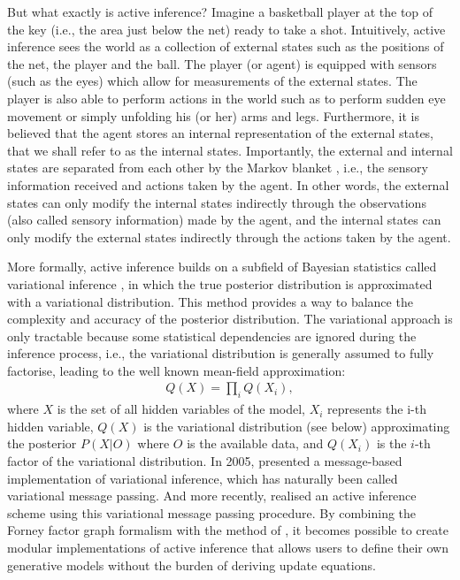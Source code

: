 \documentclass[twoside,11pt]{article}
\begin{document}
But what exactly is active inference? Imagine a basketball player at the top of the key (i.e., the area just below the net) ready to take a shot. Intuitively, active inference sees the world as a collection of external states such as the positions of the net, the player and the ball. The player (or agent) is equipped with sensors (such as the eyes) which allow for measurements of the external states. The player is also able to perform actions in the world such as to perform sudden eye movement or simply unfolding his (or her) arms and legs. Furthermore, it is believed that the agent stores an internal representation of the external states, that we shall refer to as the internal states. Importantly, the external and internal states are separated from each other by the Markov blanket \citep{MarkovBlanket}, i.e., the sensory information received and actions taken by the agent. In other words, the external states can only modify the internal states indirectly through the observations (also called sensory information) made by the agent, and the internal states can only modify the external states indirectly through the actions taken by the agent. 

More formally, active inference builds on a subfield of Bayesian statistics called variational inference \citep{VI_TUTO}, in which the true posterior distribution is approximated with a variational distribution. This method provides a way to balance the complexity and accuracy of the posterior distribution. The variational approach is only tractable because some statistical dependencies are ignored during the inference process, i.e., the variational distribution is generally assumed to fully factorise, leading to the well known mean-field approximation:
\begin{align}
Q(X) = \prod_{i} Q(X_i),
\end{align}
where $X$ is the set of all hidden variables of the model, $X_i$ represents the i-th hidden variable, $Q(X)$ is the variational distribution (see below) approximating the posterior $P(X|O)$ where $O$ is the available data, and $Q(X_i)$ is the $i$-th factor of the variational distribution. In 2005, \citet{VMP_TUTO} presented a message-based implementation of variational inference, which has naturally been called variational message passing. And more recently, \citet{AI_VMP} realised an active inference scheme using this variational message passing procedure. By combining the Forney factor graph formalism \citep{FFG_TUTO} with the method of \citet{VMP_TUTO}, it becomes possible to create modular implementations of active inference \citep{Simul_AI,DBLP:journals/ijar/CoxLV19} that allows users to define their own generative models without the burden of deriving update equations.
\end{document}
